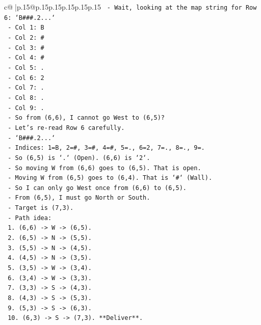 \documentclass{article}
\begin{document}
{\begin{supertabular}{c@{$\;$}|p{.15\linewidth}@{}p{.15\linewidth}p{.15\linewidth}p{.15\linewidth}p{.15\linewidth}p{.15\linewidth}}
{{{\texttt{  {-} Wait, looking at the map string for Row 6: `B\#\#\#.2...`} \\
\texttt{    {-} Col 1: B} \\
\texttt{    {-} Col 2: \#} \\
\texttt{    {-} Col 3: \#} \\
\texttt{    {-} Col 4: \#} \\
\texttt{    {-} Col 5: .} \\
\texttt{    {-} Col 6: 2} \\
\texttt{    {-} Col 7: .} \\
\texttt{    {-} Col 8: .} \\
\texttt{    {-} Col 9: .} \\
\texttt{  {-} So from (6,6), I cannot go West to (6,5)?} \\
\texttt{  {-} Let's re{-}read Row 6 carefully.} \\
\texttt{  {-} `B\#\#\#.2...`} \\
\texttt{  {-} Indices: 1=B, 2=\#, 3=\#, 4=\#, 5=., 6=2, 7=., 8=., 9=.} \\
\texttt{  {-} So (6,5) is `.` (Open). (6,6) is `2`.} \\
\texttt{  {-} So moving W from (6,6) goes to (6,5). That is open.} \\
\texttt{  {-} Moving W from (6,5) goes to (6,4). That is `\#` (Wall).} \\
\texttt{  {-} So I can only go West once from (6,6) to (6,5).} \\
\texttt{  {-} From (6,5), I must go North or South.} \\
\texttt{  {-} Target is (7,3).} \\
\texttt{  {-} Path idea:} \\
\texttt{    1. (6,6) {-}> W {-}> (6,5).} \\
\texttt{    2. (6,5) {-}> N {-}> (5,5).} \\
\texttt{    3. (5,5) {-}> N {-}> (4,5).} \\
\texttt{    4. (4,5) {-}> N {-}> (3,5).} \\
\texttt{    5. (3,5) {-}> W {-}> (3,4).} \\
\texttt{    6. (3,4) {-}> W {-}> (3,3).} \\
\texttt{    7. (3,3) {-}> S {-}> (4,3).} \\
\texttt{    8. (4,3) {-}> S {-}> (5,3).} \\
\texttt{    9. (5,3) {-}> S {-}> (6,3).} \\
\texttt{    10. (6,3) {-}> S {-}> (7,3). **Deliver**.} \\
}}}
\end{supertabular}}
\end{document}
